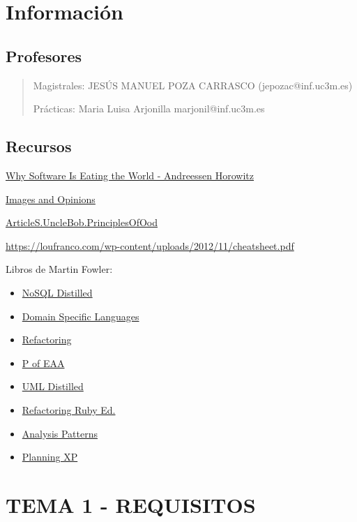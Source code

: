 \documentclass[12pt, twoside, openright]{report} %
\begin{document}

\chapter{Información}
\section{Profesores}
\begin{quote}
	Magistrales: JESÚS MANUEL POZA CARRASCO (jepozac@inf.uc3m.es)

	Prácticas: Maria Luisa Arjonilla marjonil@inf.uc3m.es
\end{quote}

\section{Recursos}
\href{https://a16z.com/2011/08/20/why-software-is-eating-the-world/}{Why
	Software Is Eating the World - Andreessen Horowitz}

\href{https://iansommerville.com/software-engineering-book/}{Images and
	Opinions}

\href{http://butunclebob.com/ArticleS.UncleBob.PrinciplesOfOod}{ArticleS.UncleBob.PrinciplesOfOod}

\url{https://loufranco.com/wp-content/uploads/2012/11/cheatsheet.pdf}

Libros de Martin Fowler:
\begin{itemize}
	\item \href{http://martinfowler.com/books/nosql.html}{NoSQL Distilled}
	\item \href{http://martinfowler.com/books/dsl.html}{Domain Specific
		      Languages}
	\item \href{http://martinfowler.com/books/refactoring.html}{Refactoring}
	\item \href{http://martinfowler.com/books/eaa.html}{P of EAA}
	\item \href{http://martinfowler.com/books/uml.html}{UML Distilled}
	\item \href{http://martinfowler.com/books/refactoringRubyEd.html}{Refactoring
		      Ruby Ed.}
	\item \href{http://martinfowler.com/books/ap.html}{Analysis Patterns}
	\item \href{http://martinfowler.com/books/pxp.html}{Planning XP}
\end{itemize}


\chapter{TEMA 1 - REQUISITOS}
\end{document}
